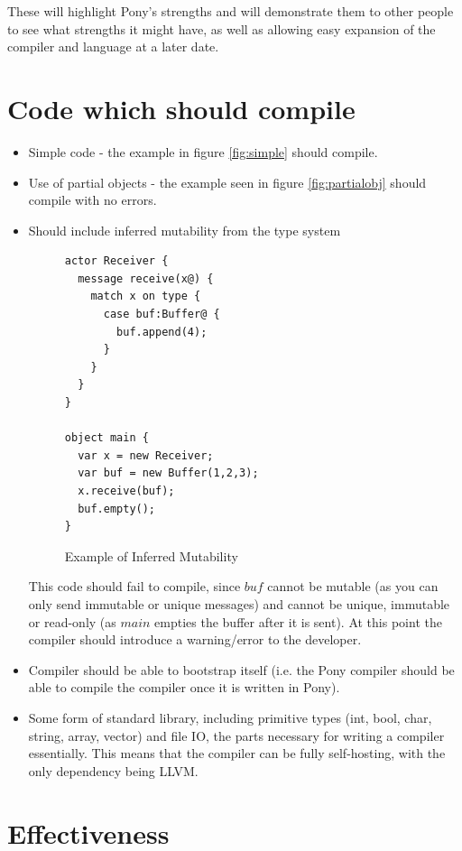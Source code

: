 \documentclass[pdftex,11pt,a4paper]{report}
\begin{document}
These will highlight Pony's strengths and will demonstrate them to other people to see what strengths it might have, as well as allowing easy expansion of the compiler and language at a later date.

\section{Code which should compile}

\begin{itemize}

\item Simple code - the example in figure \ref{fig:simple} should compile.
\item Use of partial objects - the example seen in figure \ref{fig:partialobj} should compile with no errors.

\item Should include inferred mutability from the type system

\begin{figure}[H]
\begin{verbatim}
actor Receiver {
  message receive(x@) {
    match x on type {
      case buf:Buffer@ {
        buf.append(4);
      }
    }
  }
}

object main {
  var x = new Receiver;
  var buf = new Buffer(1,2,3);
  x.receive(buf);
  buf.empty();
}
\end{verbatim}
\caption{Example of Inferred Mutability}
\end{figure}

This code should fail to compile, since $buf$ cannot be mutable (as you can only send immutable or unique messages) and cannot be unique, immutable or read-only (as $main$ empties the buffer after it is sent).
At this point the compiler should introduce a warning/error to the developer.

\item Compiler should be able to bootstrap itself (i.e. the Pony compiler should be able to compile the compiler once it is written in Pony).

\item Some form of standard library, including primitive types (int, bool, char, string, array, vector) and file IO, the parts necessary for writing a compiler essentially.
	This means that the compiler can be fully self-hosting, with the only dependency being LLVM.
\end{itemize}

\section{Effectiveness}
\end{document}
